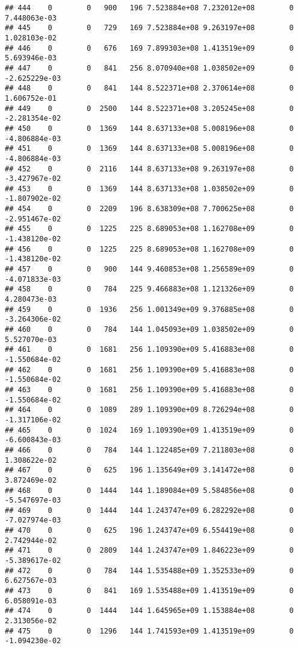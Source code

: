 \documentclass[
]{article}
\begin{document}
\begin{enumerate}
\begin{verbatim}
## 444    0        0   900   196 7.523884e+08 7.232012e+08        0  7.448063e-03
## 445    0        0   729   169 7.523884e+08 9.263197e+08        0  1.028103e-02
## 446    0        0   676   169 7.899303e+08 1.413519e+09        0  5.693946e-03
## 447    0        0   841   256 8.070940e+08 1.038502e+09        0 -2.625229e-03
## 448    0        0   841   144 8.522371e+08 2.370614e+08        0  1.606752e-01
## 449    0        0  2500   144 8.522371e+08 3.205245e+08        0 -2.281354e-02
## 450    0        0  1369   144 8.637133e+08 5.008196e+08        0 -4.806884e-03
## 451    0        0  1369   144 8.637133e+08 5.008196e+08        0 -4.806884e-03
## 452    0        0  2116   144 8.637133e+08 9.263197e+08        0 -3.427967e-02
## 453    0        0  1369   144 8.637133e+08 1.038502e+09        0 -1.807902e-02
## 454    0        0  2209   196 8.638309e+08 7.700625e+08        0 -2.951467e-02
## 455    0        0  1225   225 8.689053e+08 1.162708e+09        0 -1.438120e-02
## 456    0        0  1225   225 8.689053e+08 1.162708e+09        0 -1.438120e-02
## 457    0        0   900   144 9.460853e+08 1.256589e+09        0 -4.071833e-03
## 458    0        0   784   225 9.466883e+08 1.121326e+09        0  4.280473e-03
## 459    0        0  1936   256 1.001349e+09 9.376885e+08        0 -3.264306e-02
## 460    0        0   784   144 1.045093e+09 1.038502e+09        0  5.527070e-03
## 461    0        0  1681   256 1.109390e+09 5.416883e+08        0 -1.550684e-02
## 462    0        0  1681   256 1.109390e+09 5.416883e+08        0 -1.550684e-02
## 463    0        0  1681   256 1.109390e+09 5.416883e+08        0 -1.550684e-02
## 464    0        0  1089   289 1.109390e+09 8.726294e+08        0 -1.317106e-02
## 465    0        0  1024   169 1.109390e+09 1.413519e+09        0 -6.600843e-03
## 466    0        0   784   144 1.122485e+09 7.211803e+08        0  1.308622e-02
## 467    0        0   625   196 1.135649e+09 3.141472e+08        0  3.872469e-02
## 468    0        0  1444   144 1.189084e+09 5.584856e+08        0 -5.547697e-03
## 469    0        0  1444   144 1.243747e+09 6.282292e+08        0 -7.027974e-03
## 470    0        0   625   196 1.243747e+09 6.554419e+08        0  2.742944e-02
## 471    0        0  2809   144 1.243747e+09 1.846223e+09        0 -5.389617e-02
## 472    0        0   784   144 1.535488e+09 1.352533e+09        0  6.627567e-03
## 473    0        0   841   169 1.535488e+09 1.413519e+09        0  6.058091e-03
## 474    0        0  1444   144 1.645965e+09 1.153884e+08        0  2.313056e-02
## 475    0        0  1296   144 1.741593e+09 1.413519e+09        0 -1.094230e-02

\end{verbatim}
\end{enumerate}
\end{document}
